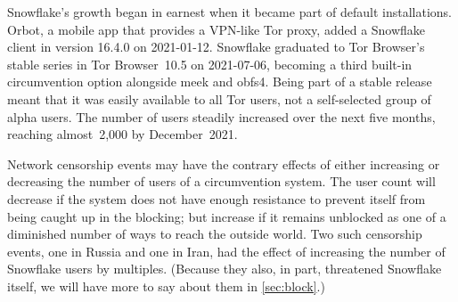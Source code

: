 \documentclass[letterpaper,twocolumn]{article}
\begin{document}
Snowflake's growth began in earnest
when it became part of default installations.
Orbot, a mobile app that provides a VPN-like Tor proxy,
added a Snowflake client in version 16.4.0
on \mbox{2021-01-12}.
Snowflake graduated to Tor Browser's stable series
in Tor Browser~10.5
on \mbox{2021-07-06},
becoming a third built-in circumvention option
alongside meek and obfs4.
Being part of a stable release meant that it was
easily available to all Tor users,
not a self-selected group of alpha users.
The number of users steadily increased
over the next five months,
reaching almost~2,000 by December~2021.

Network censorship events may have the contrary effects
of either increasing or decreasing the number of users
of a circumvention system.
The user count will decrease
if the system does not have enough resistance to prevent
itself from being caught up in the blocking;
but increase if it remains unblocked as one
of a diminished number of ways to reach the outside world.
Two such censorship events,
one in Russia and one in Iran,
had the effect of increasing the number of Snowflake users
by multiples.
(Because they also, in part, threatened Snowflake itself,
we will have more to say about them in \autoref{sec:block}.)
\end{document}
